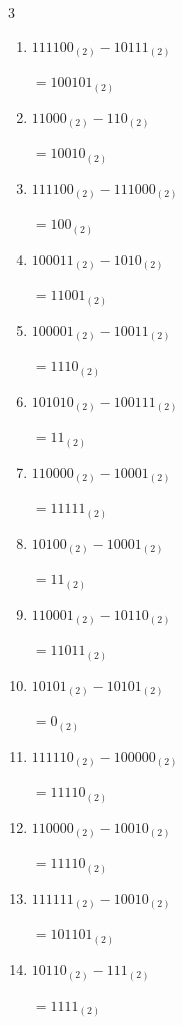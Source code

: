 \begin{multicols}{3}
\begin{enumerate}
        $=11111_{(2)}$

  \item $111100_{(2)} - 10111_{(2)}$

        $=100101_{(2)}$

  \item $11000_{(2)} - 110_{(2)}$

        $=10010_{(2)}$

  \item $111100_{(2)} - 111000_{(2)}$

        $=100_{(2)}$

  \item $100011_{(2)} - 1010_{(2)}$

        $=11001_{(2)}$

  \item $100001_{(2)} - 10011_{(2)}$

        $=1110_{(2)}$

  \item $101010_{(2)} - 100111_{(2)}$

        $=11_{(2)}$

  \item $110000_{(2)} - 10001_{(2)}$

        $=11111_{(2)}$

  \item $10100_{(2)} - 10001_{(2)}$

        $=11_{(2)}$

\columnbreak %

  \item $110001_{(2)} - 10110_{(2)}$

        $=11011_{(2)}$

  \item $10101_{(2)} - 10101_{(2)}$

        $=0_{(2)}$

  \item $111110_{(2)} - 100000_{(2)}$

        $=11110_{(2)}$

  \item $110000_{(2)} - 10010_{(2)}$

        $=11110_{(2)}$

  \item $111111_{(2)} - 10010_{(2)}$

        $=101101_{(2)}$

  \item $10110_{(2)} - 111_{(2)}$

        $=1111_{(2)}$


\end{enumerate}
\end{multicols}
